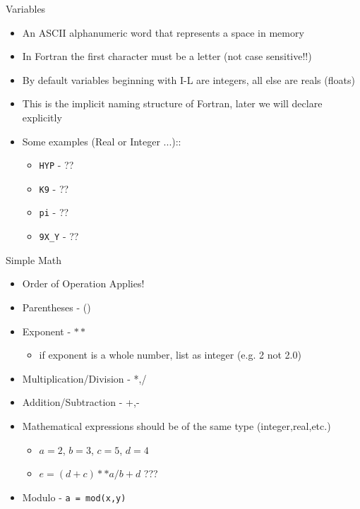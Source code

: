 \documentclass{beamer}
\begin{document}
\begin{frame}{Variables}
\begin{itemize}
  \item An ASCII alphanumeric word that represents a space in memory
  \item In Fortran the first character must be a letter (not case sensitive!!)
  \item By default variables beginning with I-L are integers, all else are reals (floats)
  \item This is the implicit naming structure of Fortran, later we will declare explicitly
  \item Some examples (Real or Integer ...)::
    \begin{itemize}
      \item \texttt{HYP} - ??
      \item \texttt{K9} - ??
      \item \texttt{pi} - ??
      \item \texttt{9X\_Y} - ??
    \end{itemize}
\end{itemize}
\end{frame}
\begin{frame}{Simple Math}
\begin{itemize}
  \item Order of Operation Applies!
  \vfill\item Parentheses - ()
  \item Exponent - $**$
   \vfill \begin{itemize}
      \item if exponent is a whole number, list as integer (e.g. 2 not 2.0)
    \end{itemize}
  \vfill\item Multiplication/Division - *,/
  \vfill\item Addition/Subtraction - +,-
  \vfill\item Mathematical expressions should be of the same type (integer,real,etc.)
    \begin{itemize}
      \item $a=2$, $b=3$, $c=5$, $d=4$
      \item $e = (d + c)**a/b + d$ ???
    \end{itemize}
  \vfill\item Modulo - \texttt{a = mod(x,y)}
\end{itemize}
\end{frame}
\end{document}
